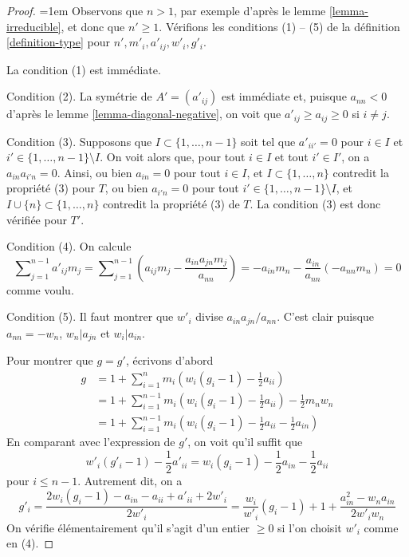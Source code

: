\begin{proof}
\begingroup
\emergencystretch=1em
Observons que $n > 1$, par exemple d'après le lemme \ref{lemma-irreducible},
et donc que $n' \geq 1$. Vérifions les conditions (1) -- (5) de la
définition \ref{definition-type} pour $n', m'_i, a'_{ij}, w'_i, g'_i$.
\par
\endgroup

\medskip\noindent
La condition (1) est immédiate.

\medskip\noindent
Condition (2). La symétrie de $A' = (a'_{ij})$ est immédiate
et, puisque $a_{nn} < 0$ d'après le lemme \ref{lemma-diagonal-negative},
on voit que $a'_{ij} \geq a_{ij} \geq 0$ si $i \not = j$.

\medskip\noindent
Condition (3). Supposons que $I \subset \{1, \ldots, n - 1\}$ soit tel que
$a'_{ii'} = 0$ pour $i \in I$ et $i' \in \{1, \ldots, n - 1\} \setminus I$.
On voit alors que, pour tout $i \in I$ et tout $i' \in I'$, on a
$a_{in}a_{i'n} = 0$. Ainsi, ou bien $a_{in} = 0$ pour tout $i \in I$, et
$I \subset \{1, \ldots, n\}$ contredit la propriété (3) pour $T$,
ou bien $a_{i'n} = 0$ pour tout $i' \in \{1, \ldots, n - 1\} \setminus I$,
et $I \cup \{n\} \subset \{1, \ldots, n\}$ contredit
la propriété (3) de $T$. La condition (3) est donc vérifiée pour $T'$.

\medskip\noindent
Condition (4). On calcule
$$
\sum\nolimits_{j = 1}^{n - 1} a'_{ij}m_j =
\sum\nolimits_{j = 1}^{n - 1}
(a_{ij}m_j - \frac{a_{in}a_{jn}m_j}{a_{nn}}) =
- a_{in}m_n - \frac{a_{in}}{a_{nn}}(-a_{nn}m_n) = 0
$$
comme voulu.

\medskip\noindent
Condition (5). Il faut montrer que $w'_i$ divise $a_{in}a_{jn}/a_{nn}$.
C'est clair puisque $a_{nn} = -w_n$, $w_n | a_{jn}$ et $w_i | a_{in}$.

\medskip\noindent
Pour montrer que $g = g'$, écrivons d'abord
\begin{align*}
g
& =
1 + \sum\nolimits_{i = 1}^n m_i(w_i(g_i - 1) - \frac{1}{2}a_{ii}) \\
& =
1 + \sum\nolimits_{i = 1}^{n - 1} m_i(w_i(g_i - 1) - \frac{1}{2}a_{ii})
-\frac{1}{2}m_nw_n \\
& =
1 +  \sum\nolimits_{i = 1}^{n - 1}
m_i(w_i(g_i - 1) - \frac{1}{2}a_{ii} - \frac{1}{2}a_{in})
\end{align*}
En comparant avec l'expression de $g'$, on voit qu'il suffit que
$$
w'_i(g'_i - 1) - \frac{1}{2}a'_{ii} =
w_i(g_i - 1) - \frac{1}{2}a_{in} - \frac{1}{2}a_{ii}
$$
pour $i \leq n - 1$. Autrement dit, on a
$$
g'_i = \frac{2w_i(g_i - 1) - a_{in} - a_{ii} + a'_{ii} + 2w'_i}{2w'_i} =
\frac{w_i}{w'_i}(g_i - 1) + 1 + \frac{a_{in}^2 - w_na_{in}}{2w'_iw_n}
$$
On vérifie élémentairement qu'il s'agit d'un entier $\geq 0$
si l'on choisit $w'_i$ comme en (4).
\end{proof}

